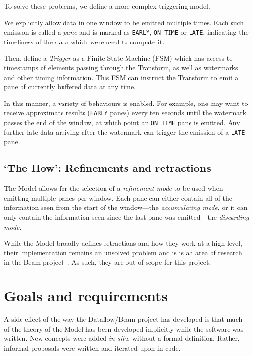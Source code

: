 To solve these problems, we define a more complex triggering model.

We explicitly allow data in one window to be emitted multiple times.
Each such emission is called a \emph{pane} and is marked as \verb|EARLY|, \verb|ON_TIME| or \verb|LATE|, indicating the timeliness of the data which were used to compute it.

Then, define a \emph{Trigger} as a Finite State Machine (FSM) which has access to timestamps of elements passing through the Transform, as well as watermarks and other timing information.
This FSM can instruct the Transform to emit a pane of currently buffered data at any time.

In this manner, a variety of behaviours is enabled.
For example, one may want to receive approximate results (\verb|EARLY| panes) every ten seconds until the watermark passes the end of the window, at which point an \verb|ON_TIME| pane is emitted.
Any further late data arriving after the watermark can trigger the emission of a \verb|LATE| pane.

\subsection{`The How': Refinements and retractions}\label{sec:prep:dataflow:how}

The Model allows for the selection of a \emph{refinement mode} to be used when emitting multiple panes per window.
Each pane can either contain all of the information seen from the start of the window---the \emph{accumulating mode}, or it can only contain the information seen since the last pane was emitted---the \emph{discarding mode}.

While the Model broadly defines retractions and how they work at a high level, their implementation remains an unsolved problem and is is an area of research in the Beam project~\cite{JIRA-retractions}.
As such, they are out-of-scope for this project.

\section{Goals and requirements}\label{sec:prep:goals}

A side-effect of the way the Dataflow/Beam project has developed is that much of the theory of the Model has been developed implicitly while the software was written.
New concepts were added \emph{in situ}, without a formal definition.
Rather, informal proposals were written and iterated upon in code.

